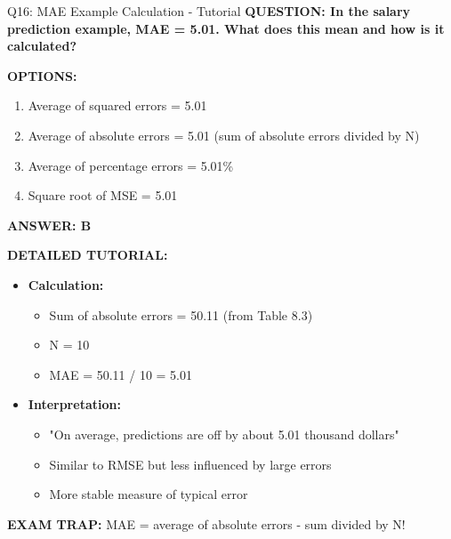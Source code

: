 \documentclass[8pt]{beamer}
\begin{document}
	\begin{frame}{Q16: MAE Example Calculation - Tutorial}
		\fontsize{6.5}{7.5}\selectfont
		\textbf{QUESTION: In the salary prediction example, MAE = 5.01. What does this mean and how is it calculated?}
		
		\vspace{0.1cm}
		\textbf{OPTIONS:}
		\begin{enumerate}
			\item Average of squared errors = 5.01
			\item Average of absolute errors = 5.01 (sum of absolute errors divided by N)
			\item Average of percentage errors = 5.01\%
			\item Square root of MSE = 5.01
		\end{enumerate}
		
		\vspace{0.1cm}
		\textcolor{myblue}{\textbf{ANSWER: B}}
		
		\vspace{0.1cm}
		\textbf{DETAILED TUTORIAL:}
		\begin{itemize}
			\item \textbf{Calculation:}
			\begin{itemize}
				\item Sum of absolute errors = 50.11 (from Table 8.3)
				\item N = 10
				\item MAE = 50.11 / 10 = 5.01
			\end{itemize}
			\item \textbf{Interpretation:}
			\begin{itemize}
				\item "On average, predictions are off by about 5.01 thousand dollars"
				\item Similar to RMSE but less influenced by large errors
				\item More stable measure of typical error
			\end{itemize}
		\end{itemize}
		
		\textcolor{myred}{\textbf{EXAM TRAP:}} MAE = \textcolor{myblue}{average of absolute errors} - sum divided by N!
	\end{frame}
	
\end{document}
